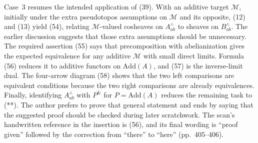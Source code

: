 Case~3 resumes the intended application of (39). With an additive target $\mathcal M$, initially under the extra pseudotopos assumptions on $\mathcal M$ and its opposite, (12) and (13) yield (54), relating $\mathcal M$-valued cosheaves on $A^\wedge_{ab}$ to sheaves on $B^\wedge_{ab}$. The earlier discussion suggests that those extra assumptions should be unnecessary. The required assertion (55) says that precomposition with abelianization gives the expected equivalence for any additive $\mathcal M$ with small direct limits. Formula (56) reduces it to additive functors on $\mathrm{Add}(A)$, and (57) is the inverse-limit dual. The four-arrow diagram (58) shows that the two left comparisons are equivalent conditions because the two right comparisons are already equivalences. Finally, identifying $A^\wedge_{ab}$ with $P^{\&}$ for $P=\mathrm{Add}(A)$ reduces the remaining task to (**). The author prefers to prove that general statement and ends by saying that the suggested proof should be checked during later scratchwork. The scan's handwritten reference in the insertion is (56), and its final wording is “proof given” followed by the correction from “there” to “here” (pp.\ 405--406).

